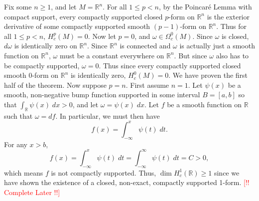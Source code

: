 \documentclass{article}
\newcommand{\complete}{\textcolor{red}{[!! Complete Later !!]}}
\begin{document}
	Fix some $n \geq 1$, and let $M= \mathbb{R}^{n}$. For all $1 \leq p < n$, by the Poincar\'e Lemma with compact support, every compactly supported closed $p$-form on $\mathbb{R}^{n}$ is the exterior derivative of some compactly supported smooth $(p-1)$-form on $\mathbb{R}^{n}$. Thus for all $1 \leq p < n$, $H^{p}_{c}(M) = 0$. Now let $p = 0$, and $\omega \in \Omega^{0}_{c}(M)$. Since $\omega$ is closed, $d\omega$ is identically zero on $\mathbb{R}^{n}$. Since $\mathbb{R}^{n}$ is connected and $\omega$ is actually just a smooth function on $\mathbb{R}^{n}$, $\omega$ must be a constant everywhere on $\mathbb{R}^{n}$. But since $\omega$ also has to be compactly supported, $\omega = 0$. Thus since every compactly supported closed smooth 0-form on $\mathbb{R}^{n}$ is identically zero, $H^{0}_{c}(M) = 0$. We have proven the first half of the theorem. Now suppose $p = n$. First assume $n = 1$. Let $\psi(x)$ be a smooth, non-negative bump function supported in some interval $B = [a,b]$ so that $\int_{\mathbb{R}}\psi(x)\;dx > 0$, and let $\omega = \psi(x)\;dx$. Let $f$ be a smooth function on $\mathbb{R}$ such that $\omega = df$. In particular, we must then have 
	\begin{equation*}
		f(x) = \int_{-\infty}^{x}\psi(t)\;dt. 
	\end{equation*}
	For any $x > b$, 
	\begin{equation*}
		f(x) = \int_{-\infty}^{x}\psi(t)\;dt = \int_{-\infty}^{\infty}\psi(t)\;dt = C > 0, 
	\end{equation*}
	which means $f$ is not compactly supported. Thus, $\dim{H^{1}_{c}(\mathbb{R})} \geq 1$ since we have shown the existence of a closed, non-exact, compactly supported 1-form. \complete
	
\end{document}
